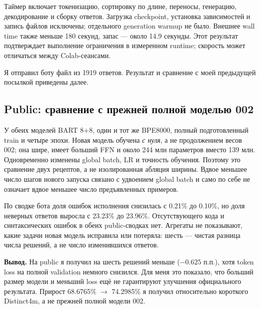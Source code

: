 Таймер включает токенизацию, сортировку по длине, переносы, генерацию,
декодирование и сборку ответов. Загрузка checkpoint, установка зависимостей
и запись файлов исключены; отдельного generation warmup не было.
Внешнее wall time также меньше 180 секунд, запас --- около 14.9 секунды.
Этот результат подтверждает выполнение ограничения в измеренном runtime;
скорость может отличаться между Colab-сеансами.

Я отправил боту файл из 1919 ответов. Результат и сравнение
с моей предыдущей посылкой приведены далее.

\subsection{Public: сравнение с прежней полной моделью 002}
\begin{table}[htbp]
\centering\small
\caption{Предыдущая официальная модель 002 и новая полная модель.
Public сравнивается с public на 960 задачах; private ещё неизвестен.}
\label{tab:publiccomparison}
\end{table}

У обеих моделей BART 8+8, один и тот же BPE8000,
полный подготовленный train и четыре эпохи. Новая модель обучена
\emph{с нуля}, а не продолжением весов 002; она шире, имеет больший FFN
и около 244 млн параметров вместо 139 млн.
Одновременно изменены global batch, LR и точность обучения.
Поэтому это сравнение двух рецептов, а не изолированная абляция ширины.
Вдвое меньшее число шагов нового запуска связано с удвоением global batch
и само по себе не означает вдвое меньшее число предъявленных примеров.

По сводке бота доля ошибок исполнения снизилась с 0.21\% до 0.10\%,
но доля неверных ответов выросла с 23.23\% до 23.96\%.
Отсутствующего кода и синтаксических ошибок в обеих public-сводках нет.
Агрегаты не показывают, какие задачи новая модель исправила или потеряла:
шесть --- чистая разница числа решений, а не число изменившихся ответов.

\textbf{Вывод.} На public я получил на шесть решений меньше
($-0.625$ п.п.), хотя token loss на полной validation немного снизился.
Для меня это показало, что больший размер модели и меньший loss
ещё не гарантируют улучшения официального результата.
Прирост 68.6765\% $\to$ 74.2985\% я получил относительно короткого
Distinct4m, а не прежней полной модели 002.

